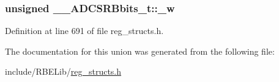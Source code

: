 \hypertarget{union_____a_d_c_s_r_bbits__t_ae618e28956c522249172f57e63f563c6}{
\subsubsection[{\+\_\+w}]{\setlength{\rightskip}{0pt plus 5cm}unsigned \+\_\+\+\_\+\+A\+D\+C\+S\+R\+Bbits\+\_\+t\+::\+\_\+w}}\label{union_____a_d_c_s_r_bbits__t_ae618e28956c522249172f57e63f563c6}


Definition at line 691 of file reg\+\_\+structs.\+h.



The documentation for this union was generated from the following file\+:\begin{DoxyCompactItemize}
\item 
include/\+R\+B\+E\+Lib/\hyperlink{reg__structs_8h}{reg\+\_\+structs.\+h}\end{DoxyCompactItemize}
